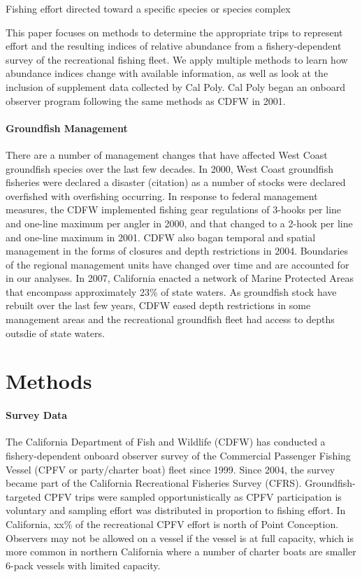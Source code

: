 \documentclass[]{elsarticle} %
\begin{document}
Fishing effort directed toward a specific species or species complex

This paper focuses on methods to determine the appropriate trips to
represent effort and the resulting indices of relative abundance from a
fishery-dependent survey of the recreational fishing fleet. We apply
multiple methods to learn how abundance indices change with available
information, as well as look at the inclusion of supplement data
collected by Cal Poly. Cal Poly began an onboard observer program
following the same methods as CDFW in 2001.

\hypertarget{groundfish-management}{%
\paragraph{Groundfish Management}\label{groundfish-management}}

There are a number of management changes that have affected West Coast
groundfish species over the last few decades. In 2000, West Coast
groundfish fisheries were declared a disaster (citation) as a number of
stocks were declared overfished with overfishing occurring. In response
to federal management measures, the CDFW implemented fishing gear
regulations of 3-hooks per line and one-line maximum per angler in 2000,
and that changed to a 2-hook per line and one-line maximum in 2001. CDFW
also bagan temporal and spatial management in the forms of closures and
depth restrictions in 2004. Boundaries of the regional management units
have changed over time and are accounted for in our analyses. In 2007,
California enacted a network of Marine Protected Areas that encompass
approximately 23\% of state waters. As groundfish stock have rebuilt
over the last few years, CDFW eased depth restrictions in some
management areas and the recreational groundfish fleet had access to
depths outsdie of state waters.

\hypertarget{methods}{%
\section{Methods}\label{methods}}

\hypertarget{survey-data}{%
\paragraph{Survey Data}\label{survey-data}}

The California Department of Fish and Wildlife (CDFW) has conducted a
fishery-dependent onboard observer survey of the Commercial Passenger
Fishing Vessel (CPFV or party/charter boat) fleet since 1999. Since
2004, the survey became part of the California Recreational Fisheries
Survey (CFRS). Groundfish-targeted CPFV trips were sampled
opportunistically as CPFV participation is voluntary and sampling effort
was distributed in proportion to fishing effort. In California, xx\% of
the recreational CPFV effort is north of Point Conception. Observers may
not be allowed on a vessel if the vessel is at full capacity, which is
more common in northern California where a number of charter boats are
smaller 6-pack vessels with limited capacity.
\end{document}
